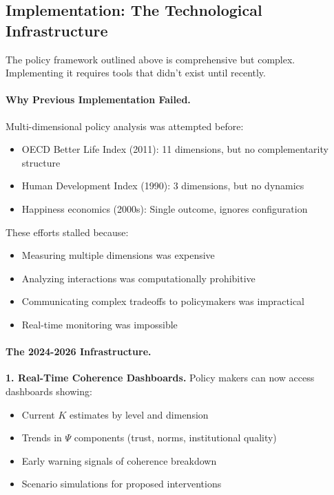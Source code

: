 \documentclass[12pt,a4paper]{article}
\begin{document}
\subsection{Implementation: The Technological Infrastructure}

The policy framework outlined above is comprehensive but complex.
Implementing it requires tools that didn't exist until recently.

\paragraph{Why Previous Implementation Failed.}
Multi-dimensional policy analysis was attempted before:
\begin{itemize}
  \item OECD Better Life Index (2011): 11 dimensions, but no complementarity structure
  \item Human Development Index (1990): 3 dimensions, but no dynamics
  \item Happiness economics (2000s): Single outcome, ignores configuration
\end{itemize}

These efforts stalled because:
\begin{itemize}
  \item Measuring multiple dimensions was expensive
  \item Analyzing interactions was computationally prohibitive
  \item Communicating complex tradeoffs to policymakers was impractical
  \item Real-time monitoring was impossible
\end{itemize}

\paragraph{The 2024-2026 Infrastructure.}

\textbf{1. Real-Time Coherence Dashboards.}
Policy makers can now access dashboards showing:
\begin{itemize}
  \item Current $K$ estimates by level and dimension
  \item Trends in $\Psi$ components (trust, norms, institutional quality)
  \item Early warning signals of coherence breakdown
  \item Scenario simulations for proposed interventions
\end{itemize}
\end{document}
